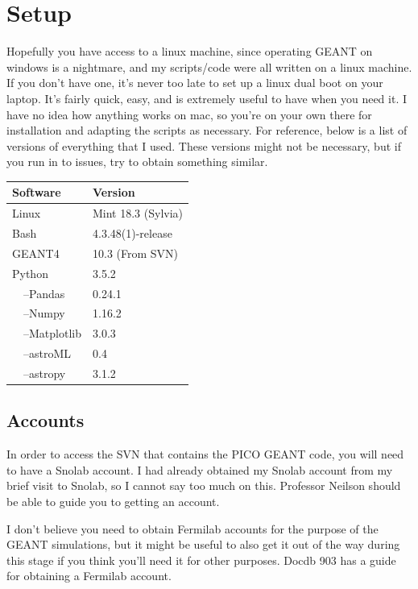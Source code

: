 \documentclass[%
12pt,
twoside,
reprint,
amsmath,amssymb,
aps,
]{article}
\begin{document}
	\section{Setup}
	\par Hopefully you have access to a linux machine, since operating GEANT on windows is a nightmare, and my scripts/code were all written on a linux machine. If you don't have one, it's never too late to set up a linux dual boot on your laptop. It's fairly quick, easy, and is extremely useful to have when you need it. I have no idea how anything works on mac, so you're on your own there for installation and adapting the scripts as necessary. For reference, below is a list of versions of everything that I used. These versions might not be necessary, but if you run in to issues, try to obtain something similar.
	\begin{table}[!h]
		\centering
		\footnotesize
		\begin{tabular}{l|l}
			\textbf{Software} & \textbf{Version} \\ \hline
			Linux & Mint 18.3 (Sylvia)\\
			Bash & 4.3.48(1)-release \\
			GEANT4 & 10.3 (From SVN) \\
			Python & 3.5.2 \\
			\ \ --Pandas & 0.24.1 \\
			\ \ --Numpy & 1.16.2 \\
			\ \ --Matplotlib & 3.0.3 \\
			\ \ --astroML & 0.4 \\
			\ \ --astropy & 3.1.2 \\
		\end{tabular}
	\end{table}

	\subsection{Accounts}
	\par In order to access the SVN that contains the PICO GEANT code, you will need to have a Snolab account. I had already obtained my Snolab account from my brief visit to Snolab, so I cannot say too much on this. Professor Neilson should be able to guide you to getting an account.
	\par I don't believe you need to obtain Fermilab accounts for the purpose of the GEANT simulations, but it might be useful to also get it out of the way during this stage if you think you'll need it for other purposes. Docdb 903 has a guide for obtaining a Fermilab account.
%	
\end{document}
